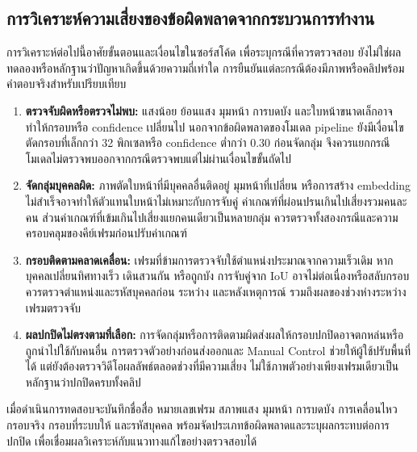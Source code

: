 \subsection{การวิเคราะห์ความเสี่ยงของข้อผิดพลาดจากกระบวนการทำงาน}

การวิเคราะห์ต่อไปนี้อาศัยขั้นตอนและเงื่อนไขในซอร์สโค้ด เพื่อระบุกรณีที่ควรตรวจสอบ ยังไม่ใช่ผลทดลองหรือหลักฐานว่าปัญหาเกิดขึ้นด้วยความถี่เท่าใด การยืนยันแต่ละกรณีต้องมีภาพหรือคลิปพร้อมคำตอบจริงสำหรับเปรียบเทียบ

\begin{enumerate}[
  label=(\arabic*),
  labelindent=0pt,
  leftmargin=\firstindentlength,
  labelwidth=0.65\firstindentlength,
  labelsep=0.35\firstindentlength,
  itemindent=0pt,
  align=left,
  listparindent=0pt,
  topsep=0.4\baselineskip,
  itemsep=0.4\baselineskip,
  parsep=0pt
]
  \item \textbf{ตรวจจับผิดหรือตรวจไม่พบ:} แสงน้อย ย้อนแสง มุมหน้า การบดบัง และใบหน้าขนาดเล็กอาจทำให้กรอบหรือ confidence เปลี่ยนไป นอกจากข้อผิดพลาดของโมเดล pipeline ยังมีเงื่อนไขตัดกรอบที่เล็กกว่า 32 พิกเซลหรือ confidence ต่ำกว่า 0.30 ก่อนจัดกลุ่ม จึงควรแยกกรณีโมเดลไม่ตรวจพบออกจากกรณีตรวจพบแต่ไม่ผ่านเงื่อนไขขั้นถัดไป
  \item \textbf{จัดกลุ่มบุคคลผิด:} ภาพตัดใบหน้าที่มีบุคคลอื่นติดอยู่ มุมหน้าที่เปลี่ยน หรือการสร้าง embedding ไม่สำเร็จอาจทำให้ตัวแทนใบหน้าไม่เหมาะกับการจับคู่ ค่าเกณฑ์ที่ผ่อนปรนเกินไปเสี่ยงรวมคนละคน ส่วนค่าเกณฑ์ที่เข้มเกินไปเสี่ยงแยกคนเดียวเป็นหลายกลุ่ม ควรตรวจทั้งสองกรณีและความครอบคลุมของคีย์เฟรมก่อนปรับค่าเกณฑ์
  \item \textbf{กรอบติดตามคลาดเคลื่อน:} เฟรมที่ข้ามการตรวจจับใช้ตำแหน่งประมาณจากความเร็วเดิม หากบุคคลเปลี่ยนทิศทางเร็ว เดินสวนกัน หรือถูกบัง การจับคู่จาก IoU อาจไม่ต่อเนื่องหรือสลับกรอบ ควรตรวจตำแหน่งและรหัสบุคคลก่อน ระหว่าง และหลังเหตุการณ์ รวมถึงผลของช่วงห่างระหว่างเฟรมตรวจจับ
  \item \textbf{ผลปกปิดไม่ตรงตามที่เลือก:} การจัดกลุ่มหรือการติดตามผิดส่งผลให้กรอบปกปิดอาจตกหล่นหรือถูกนำไปใช้กับคนอื่น การตรวจตัวอย่างก่อนส่งออกและ Manual Control ช่วยให้ผู้ใช้ปรับพื้นที่ได้ แต่ยังต้องตรวจวิดีโอผลลัพธ์ตลอดช่วงที่มีความเสี่ยง ไม่ใช้ภาพตัวอย่างเพียงเฟรมเดียวเป็นหลักฐานว่าปกปิดครบทั้งคลิป
\end{enumerate}

เมื่อดำเนินการทดสอบจะบันทึกชื่อสื่อ หมายเลขเฟรม สภาพแสง มุมหน้า การบดบัง การเคลื่อนไหว กรอบจริง กรอบที่ระบบให้ และรหัสบุคคล พร้อมจัดประเภทข้อผิดพลาดและระบุผลกระทบต่อการปกปิด เพื่อเชื่อมผลวิเคราะห์กับแนวทางแก้ไขอย่างตรวจสอบได้

